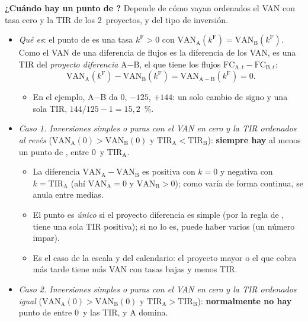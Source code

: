 \documentclass[11pt]{article}
\begin{document}
\begin{anotaciones}
\textbf{¿Cuándo hay un punto de ?} Depende de cómo vayan ordenados el VAN con tasa cero y la TIR de los 2~proyectos, y del tipo de inversión.
\begin{itemize}
\item \emph{Qué es}: el punto de  es una tasa $k^{\mathrm F}>0$ con $\mathrm{VAN}_{\mathrm A}(k^{\mathrm F})=\mathrm{VAN}_{\mathrm B}(k^{\mathrm F})$. Como el VAN de una diferencia de flujos es la diferencia de los VAN, es una TIR del \emph{proyecto diferencia} A$-$B, el que tiene los flujos $\mathrm{FC}_{\mathrm A,t}-\mathrm{FC}_{\mathrm B,t}$:
  \[
  \mathrm{VAN}_{\mathrm A}(k^{\mathrm F})-\mathrm{VAN}_{\mathrm B}(k^{\mathrm F})=\mathrm{VAN}_{\mathrm A-\mathrm B}(k^{\mathrm F})=0.
  \]
  \begin{itemize}
  \item En el ejemplo, A$-$B da $0$, $-125$, $+144$: un solo cambio de signo y una sola TIR, $144/125-1=15{,}2$~\%.
  \end{itemize}
\item \emph{Caso 1. Inversiones simples o puras con el VAN en cero y la TIR ordenados al revés} ($\mathrm{VAN}_{\mathrm A}(0)>\mathrm{VAN}_{\mathrm B}(0)$ y $\mathrm{TIR}_{\mathrm A}<\mathrm{TIR}_{\mathrm B}$): \textbf{siempre hay} al menos un punto de , entre 0~y $\mathrm{TIR}_{\mathrm A}$.
  \begin{itemize}
  \item La diferencia $\mathrm{VAN}_{\mathrm A}-\mathrm{VAN}_{\mathrm B}$ es positiva con $k=0$ y negativa con $k=\mathrm{TIR}_{\mathrm A}$ (ahí $\mathrm{VAN}_{\mathrm A}=0$ y $\mathrm{VAN}_{\mathrm B}>0$); como varía de forma continua, se anula entre medias.
  \item El punto es \emph{único} si el proyecto diferencia es simple (por la regla de , tiene una sola TIR positiva); si no lo es, puede haber varios (un número impar).
  \item Es el caso de la escala y del calendario: el proyecto mayor o el que cobra más tarde tiene más VAN con tasas bajas y menos TIR.
  \end{itemize}
\item \emph{Caso 2. Inversiones simples o puras con el VAN en cero y la TIR ordenados igual} ($\mathrm{VAN}_{\mathrm A}(0)>\mathrm{VAN}_{\mathrm B}(0)$ y $\mathrm{TIR}_{\mathrm A}>\mathrm{TIR}_{\mathrm B}$): \textbf{normalmente no hay} punto de  entre 0~y las TIR, y A domina.
  \begin{itemize}

\end{itemize}
\end{itemize}
\end{anotaciones}
\end{document}
